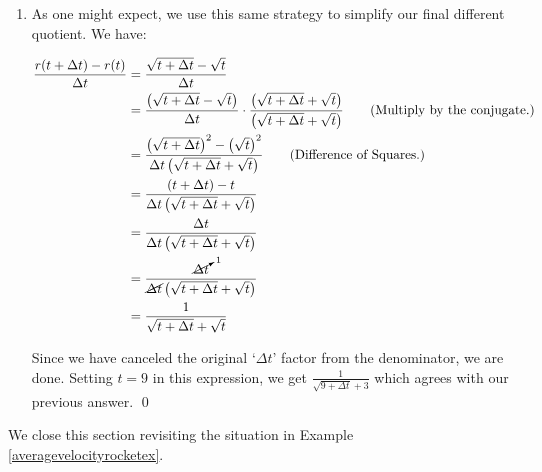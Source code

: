\begin{ex}
\begin{enumerate}
\begin{enumerate}
\item As one might expect, we use this same strategy to simplify our final  different quotient. We have:

\begin{align*}
\dfrac{r(t+\Delta t) - r(t)}{\Delta t} & = \dfrac{\sqrt{t+\Delta t} - \sqrt{t}}{\Delta t} \\
& = \dfrac{\left(\sqrt{t+\Delta t} - \sqrt{t}\right)}{\Delta t} \cdot \dfrac{\left(\sqrt{t+\Delta t} + \sqrt{t}\right)}{\left(\sqrt{t+\Delta t} + \sqrt{t}\right)} \tag{Multiply by the conjugate.} \\
& = \dfrac{\left(\sqrt{t+\Delta t}\right)^2 - \left(\sqrt{t}\right)^2}{\Delta t\left(\sqrt{t+\Delta t} + \sqrt{t}\right)} \tag{Difference of Squares.}\\
& = \dfrac{(t+\Delta t) - t}{\Delta t\left(\sqrt{t+\Delta t} + \sqrt{t}\right)} \\
& = \dfrac{\Delta t}{\Delta t\left(\sqrt{t+\Delta t} + \sqrt{t}\right)} \\
& = \dfrac{\cancelto{1}{\Delta t}}{\cancel{\Delta t}\left(\sqrt{t+\Delta t} + \sqrt{t}\right)} \\
& = \dfrac{1}{\sqrt{t+\Delta t} + \sqrt{t}} \\ 
\end{align*}

Since we have canceled the original `$\Delta t$' factor from the denominator, we are done.  Setting $t=9$ in this expression, we get $\frac{1}{\sqrt{9+\Delta t} +3}$ which agrees with our previous answer. \qed

\end{enumerate}

\end{enumerate}

\end{ex}

We close this section revisiting the situation in Example \ref{averagevelocityrocketex}. 


